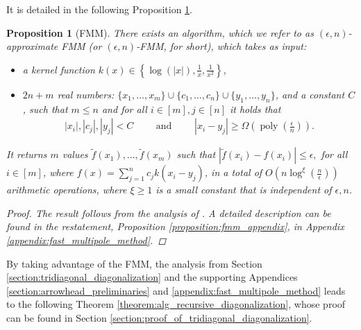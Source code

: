 \documentclass{article}
\newcommand{\labs}{\left|}
\newcommand{\rabs}{\right|}
\newcommand{\lcurly}{\left\{}
\newcommand{\rcurly}{\right\}}
\newcommand{\lpar}{\left(}
\newcommand{\rpar}{\right)}
\newtheorem{proposition}{Proposition}[section]
\DeclareMathOperator{\poly}{poly}
\newcommand{\cfmm}{\xi}
\newcommand{\fmmalgo}{FMM} \usepackage[utf8]{inputenc}
\begin{document}
    It is detailed in the following Proposition \ref{proposition:fmm}. \begin{proposition}[FMM]
    \label{proposition:fmm}
    There exists an algorithm, which we refer to as $(\epsilon,n)$-approximate FMM (or $(\epsilon,n)$-\fmmalgo, for short), which takes as input:
    \begin{itemize}
        \item a kernel function $k(x)\in\lcurly \log(|x|), \frac{1}{x}, \frac{1}{x^2} \rcurly$,
        \item $2n+m$ real numbers: $\{x_1,\ldots,x_m\}\cup \{c_1,\ldots,c_n\}\cup\{y_1,\ldots,y_n\}$, and a constant $C$, such that $m\leq n$ and for all $i\in[m],j\in[n]$ it holds that
        \begin{align*}
            |x_i|,|c_j|,|y_j|<C
            \qquad
            \text{ and }
            \qquad
            |x_i-y_j|\geq \Omega(\poly(\tfrac{\epsilon}{n})).
        \end{align*}
    \end{itemize}
    It returns $m$ values $\widetilde f(x_1),\ldots,\widetilde f(x_m)$ such that
    $
        \labs
            \widetilde f(x_i)-f(x_i)
        \rabs
        \leq \epsilon,
    $
    for all $i\in[m]$, where $f(x) = \sum_{j=1}^n c_j k(x_i-y_j)$,
    in a total of $O\lpar 
        n\log^{\cfmm}(\tfrac{n}{\epsilon})
    \rpar$ arithmetic operations, where $\cfmm\geq 1$ is a small constant that is independent of $\epsilon,n$.
    \begin{proof}
        The result follows from the analysis of \cite{gu1993stable,livne2002n,cai2020stable}. A detailed description can be found in the restatement, Proposition \ref{proposition:fmm_appendix}, in Appendix \ref{appendix:fast_multipole_method}.
    \end{proof}
\end{proposition}
By taking advantage of the FMM, the analysis from Section \ref{section:tridiagonal_diagonalization} and the supporting Appendices \ref{section:arrowhead_preliminaries} and \ref{appendix:fast_multipole_method} leads to the following Theorem \ref{theorem:alg_recursive_diagonalization}, whose proof can be found in Section \ref{section:proof_of_tridiagonal_diagonalization}.    
\end{document}
